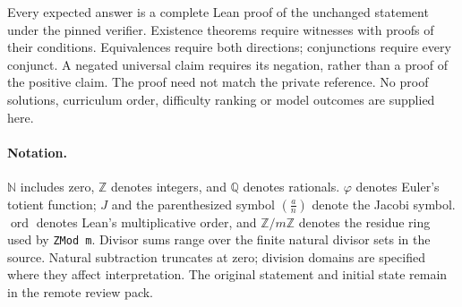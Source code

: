 \documentclass[11pt]{article}
\newcommand{\code}[1]{\texttt{#1}}
\begin{document}
Every expected answer is a complete Lean proof of the unchanged statement under the pinned verifier.
Existence theorems require witnesses with proofs of their conditions.
Equivalences require both directions; conjunctions require every conjunct.
A negated universal claim requires its negation, rather than a proof of the positive claim.
The proof need not match the private reference.
No proof solutions, curriculum order, difficulty ranking or model outcomes are supplied here.

\paragraph{Notation.}
$\mathbb N$ includes zero, $\mathbb Z$ denotes integers, and $\mathbb Q$ denotes rationals.
$\varphi$ denotes Euler's totient function; $J$ and the parenthesized symbol $\left(\frac{a}{n}\right)$ denote the Jacobi symbol.
$\operatorname{ord}$ denotes Lean's multiplicative order, and $\mathbb Z/m\mathbb Z$ denotes the residue ring used by \code{ZMod m}.
Divisor sums range over the finite natural divisor sets in the source.
Natural subtraction truncates at zero; division domains are specified where they affect interpretation.
The original statement and initial state remain in the remote review pack.
\end{document}
